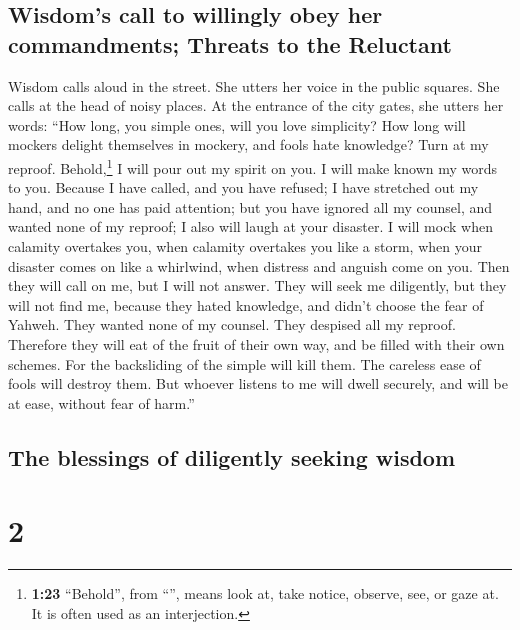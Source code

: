 \hypertarget{wisdoms-call-to-willingly-obey-her-commandments-threats-to-the-reluctant}{%
\subsection{Wisdom's call to willingly obey her commandments; Threats to
the
Reluctant}\label{wisdoms-call-to-willingly-obey-her-commandments-threats-to-the-reluctant}}

 Wisdom calls aloud in the street. She utters her voice
in the public squares.  She calls at the head of noisy
places. At the entrance of the city gates, she utters her words:
 ``How long, you simple ones, will you love simplicity?
How long will mockers delight themselves in mockery, and fools hate
knowledge?  Turn at my reproof. Behold,\footnote{\textbf{1:23}
  ``Behold'', from ``'', means look at, take notice,
  observe, see, or gaze at. It is often used as an interjection.} I will
pour out my spirit on you. I will make known my words to you.
 Because I have called, and you have refused; I have
stretched out my hand, and no one has paid attention; 
but you have ignored all my counsel, and wanted none of my reproof;
 I also will laugh at your disaster. I will mock when
calamity overtakes you,  when calamity overtakes you like
a storm, when your disaster comes on like a whirlwind, when distress and
anguish come on you.  Then they will call on me, but I
will not answer. They will seek me diligently, but they will not find
me,  because they hated knowledge, and didn't choose the
fear of Yahweh.  They wanted none of my counsel. They
despised all my reproof.  Therefore they will eat of the
fruit of their own way, and be filled with their own schemes.
 For the backsliding of the simple will kill them. The
careless ease of fools will destroy them.  But whoever
listens to me will dwell securely, and will be at ease, without fear of
harm.''

\hypertarget{the-blessings-of-diligently-seeking-wisdom}{%
\subsection{The blessings of diligently seeking
wisdom}\label{the-blessings-of-diligently-seeking-wisdom}}

\hypertarget{section-1}{%
\section{2}\label{section-1}}

